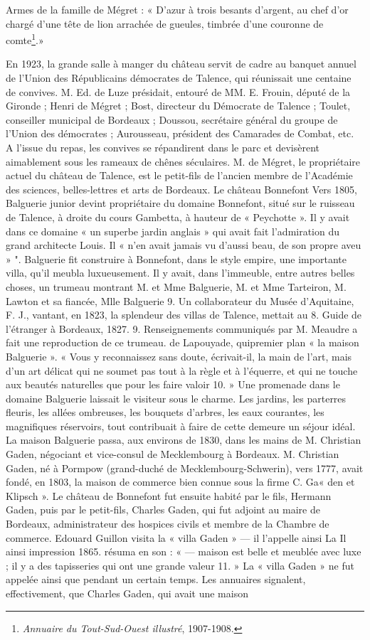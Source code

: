 Armes de la famille de Mégret : « D'azur à trois besants d'argent, au chef d'or chargé d'une tête de lion arrachée de gueules, timbrée d'une couronne de comte\footnote{\textit{Annuaire du Tout-Sud-Ouest illustré}, 1907-1908.}.»

En 1923, la grande salle à manger du château servit de cadre au banquet annuel de l'Union des Républicains démocrates de Talence, qui réunissait une centaine de convives. M. Ed. de Luze présidait, entouré de MM. E. Frouin, député de la Gironde ; Henri de Mégret ; Bost, directeur du Démocrate de Talence ; Toulet, conseiller municipal de Bordeaux ; Doussou, secrétaire général du groupe de l'Union des démocrates ; Aurousseau, président des Camarades de Combat, etc. A l'issue du repas, les convives se répandirent dans le parc et devisèrent aimablement sous les rameaux de chênes séculaires. M. de Mégret, le propriétaire actuel du château de Talence, est le petit-fils de l'ancien membre de l'Académie des sciences, belles-lettres et arts de Bordeaux. Le château Bonnefont Vers 1805, Balguerie junior devint propriétaire du domaine Bonnefont, situé sur le ruisseau de Talence, à droite du cours Gambetta, à hauteur de « Peychotte ». Il y avait dans ce domaine « un superbe jardin anglais » qui avait fait l'admiration du grand architecte Louis. Il « n'en avait jamais vu d'aussi beau, de son propre aveu » ". Balguerie fit construire à Bonnefont, dans le style empire, une importante villa, qu'il meubla luxueusement. Il y avait, dans l'immeuble, entre autres belles choses, un trumeau montrant M. et Mme Balguerie, M. et Mme Tarteiron, M. Lawton et sa fiancée, Mlle Balguerie 9. Un collaborateur du Musée d'Aquitaine, F. J., vantant, en 1823, la splendeur des villas de Talence, mettait au 8. Guide de l'étranger à Bordeaux, 1827. 9. Renseignements communiqués par M. Meaudre a fait une reproduction de ce trumeau. de Lapouyade, quipremier plan « la maison Balguerie ». « Vous y reconnaissez sans doute, écrivait-il, la main de l'art, mais d'un art délicat qui ne soumet pas tout à la règle et à l'équerre, et qui ne touche aux beautés naturelles que pour les faire valoir 10. » Une promenade dans le domaine Balguerie laissait le visiteur sous le charme. Les jardins, les parterres fleuris, les allées ombreuses, les bouquets d'arbres, les eaux courantes, les magnifiques réservoirs, tout contribuait à faire de cette demeure un séjour idéal. La maison Balguerie passa, aux environs de 1830, dans les mains de M. Christian Gaden, négociant et vice-consul de Mecklembourg à Bordeaux. M. Christian Gaden, né à Pormpow (grand-duché de Mecklembourg-Schwerin), vers 1777, avait fondé, en 1803, la maison de commerce bien connue sous la firme C. Ga« den et Klipsch ». Le château de Bonnefont fut ensuite habité par le fils, Hermann Gaden, puis par le petit-fils, Charles Gaden, qui fut adjoint au maire de Bordeaux, administrateur des hospices civils et membre de la Chambre de commerce. Edouard Guillon visita la « villa Gaden » — il l'appelle ainsi La Il ainsi impression 1865. résuma en son : « — maison est belle et meublée avec luxe ; il y a des tapisseries qui ont une grande valeur 11. » La « villa Gaden » ne fut appelée ainsi que pendant un certain temps. Les annuaires signalent, effectivement, que Charles Gaden, qui avait une maison 